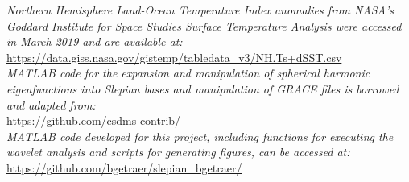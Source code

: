 \noindent\textit{Northern Hemisphere Land-Ocean Temperature Index anomalies from NASA's Goddard Institute for Space Studies Surface Temperature Analysis \cite[GISTEMP v3, see][]{hansen2010} were accessed in March 2019 and are available at:} \\ 
\indent \url{https://data.giss.nasa.gov/gistemp/tabledata_v3/NH.Ts+dSST.csv}\\



\noindent\textit{MATLAB code for the expansion and manipulation of spherical harmonic
eigenfunctions into Slepian bases and manipulation of GRACE files is borrowed and adapted from:} \\
\indent \url{https://github.com/csdms-contrib/}\\

\noindent\textit{MATLAB code developed for this project, including functions for executing the wavelet analysis and scripts for generating figures, can be accessed at:} \\
\indent \url{https://github.com/bgetraer/slepian_bgetraer/}\\




